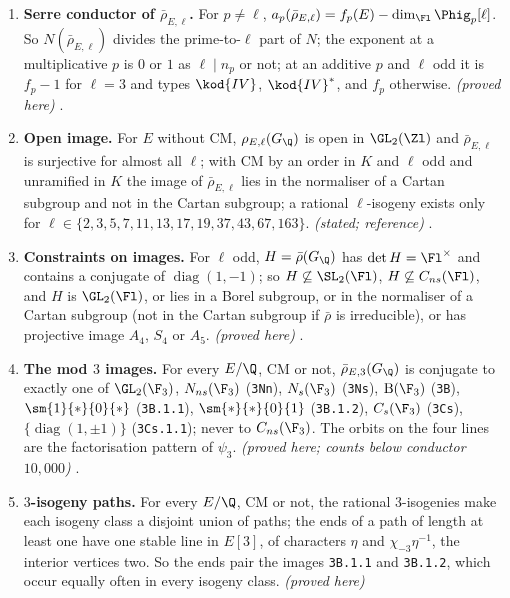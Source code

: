 \begin{enumerate}[label=\textbf{\thechapter.\arabic*}]
twists unramified at $p$. \emph{(definition; proved here)} ,
.
\item \textbf{Serre conductor of $\bar\rho_{E,\ell}$.} For $p\ne\ell$, $a_p(\bar\rho_{E,\ell})=f_p(E)-\dim_{\Fl}\Phig_p[\ell]$. So $N(\bar\rho_{E,\ell})$ divides
the prime-to-$\ell$ part of $N$; the exponent at a multiplicative $p$ is $0$ or $1$ as $\ell\mid n_p$ or not; at an additive $p$ and $\ell$
odd it is $f_p-1$ for $\ell=3$ and types $\kod{IV}$, $\kod{IV}^*$, and $f_p$ otherwise. \emph{(proved here)}
.
\item \textbf{Open image.} For $E$ without CM, $\rho_{E,\ell}(G_\Q)$ is open in $\GL_2(\Zl)$ and $\bar\rho_{E,\ell}$ is surjective for almost all $\ell$; with
CM by an order in $K$ and $\ell$ odd and unramified in $K$ the image of $\bar\rho_{E,\ell}$ lies in the normaliser of a Cartan subgroup and not in the Cartan
subgroup; a rational $\ell$-isogeny exists only for $\ell\in\{2,3,5,7,11,13,17,19,37,43,67,163\}$. \emph{(stated; reference)}
.
\item \textbf{Constraints on images.} For $\ell$ odd, $H=\bar\rho(G_\Q)$ has $\det H=\Fl^\times$ and contains a conjugate of $\operatorname{diag}(1,-1)$; so
$H\not\subseteq\SL_2(\Fl)$, $H\not\subseteq C_{ns}(\Fl)$, and $H$ is $\GL_2(\Fl)$, or lies in a Borel subgroup, or in the normaliser of a Cartan
subgroup (not in the Cartan subgroup if $\bar\rho$ is irreducible), or has projective image $A_4$, $S_4$ or $A_5$. \emph{(proved here)}
.
\item \textbf{The mod $3$ images.} For every $E/\Q$, CM or not, $\bar\rho_{E,3}(G_\Q)$ is conjugate to exactly one of $\GL_2(\F_3)$, $N_{ns}(\F_3)$
(\texttt{3Nn}), $N_s(\F_3)$ (\texttt{3Ns}), $\mathrm B(\F_3)$ (\texttt{3B}), $\sm{1}{*}{0}{*}$ (\texttt{3B.1.1}), $\sm{*}{*}{0}{1}$ (\texttt{3B.1.2}), $C_s(\F_3)$
(\texttt{3Cs}), $\{\operatorname{diag}(1,\pm1)\}$ (\texttt{3Cs.1.1}); never to $C_{ns}(\F_3)$. The orbits on the four lines are the factorisation pattern of
$\psi_3$. \emph{(proved here; counts below conductor $10{,}000$)} .
\item \textbf{$3$-isogeny paths.} For every $E/\Q$, CM or not, the rational $3$-isogenies make each isogeny class a disjoint union of paths; the
ends of a path of length at least one have one stable line in $E[3]$, of characters $\eta$ and $\chi_{-3}\eta^{-1}$, the interior vertices two. So
the ends pair the images \texttt{3B.1.1} and \texttt{3B.1.2}, which occur equally often in every isogeny class. \emph{(proved here)}

\end{enumerate}
